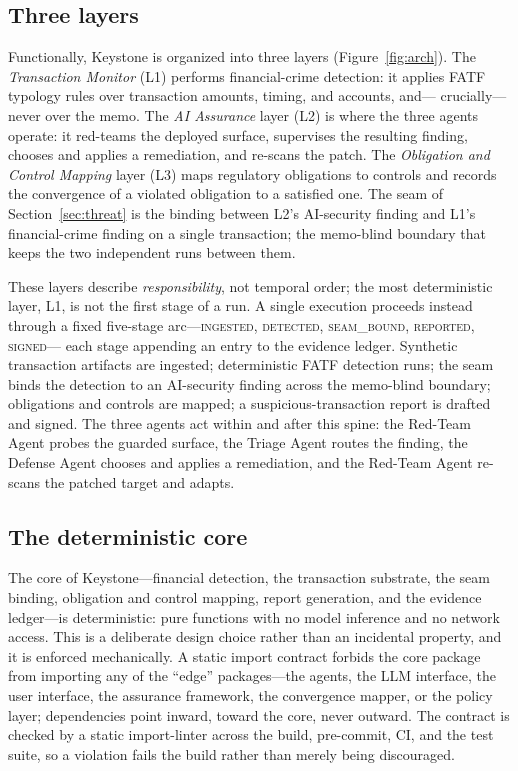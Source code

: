 \documentclass[10pt,twocolumn]{article}
\begin{document}
\subsection{Three layers}

Functionally, Keystone is organized into three layers (Figure~\ref{fig:arch}). The
\emph{Transaction Monitor} (L1) performs financial-crime detection: it applies
FATF typology rules over transaction amounts, timing, and accounts, and---
crucially---never over the memo. The \emph{AI Assurance} layer (L2) is where the
three agents operate: it red-teams the deployed surface, supervises the
resulting finding, chooses and applies a remediation, and re-scans the patch.
The \emph{Obligation and Control Mapping} layer (L3) maps regulatory obligations
to controls and records the convergence of a violated obligation to a satisfied
one. The seam of Section~\ref{sec:threat} is the binding between L2's AI-security finding and
L1's financial-crime finding on a single transaction; the memo-blind boundary
that keeps the two independent runs between them.

These layers describe \emph{responsibility}, not temporal order; the most
deterministic layer, L1, is not the first stage of a run. A single execution
proceeds instead through a fixed five-stage arc---\textsc{ingested},
\textsc{detected}, \textsc{seam\_bound}, \textsc{reported}, \textsc{signed}---
each stage appending an entry to the evidence ledger. Synthetic transaction
artifacts are ingested; deterministic FATF detection runs; the seam binds the
detection to an AI-security finding across the memo-blind boundary; obligations
and controls are mapped; a suspicious-transaction report is drafted and signed.
The three agents act within and after this spine: the Red-Team Agent probes the
guarded surface, the Triage Agent routes the finding, the Defense Agent chooses
and applies a remediation, and the Red-Team Agent re-scans the patched target
and adapts.

\subsection{The deterministic core}

The core of Keystone---financial detection, the transaction substrate, the seam
binding, obligation and control mapping, report generation, and the evidence
ledger---is deterministic: pure functions with no model inference and no network
access. This is a deliberate design choice rather than an incidental property,
and it is enforced mechanically. A static import contract forbids the core
package from importing any of the ``edge'' packages---the agents, the LLM
interface, the user interface, the assurance framework, the convergence mapper,
or the policy layer; dependencies point inward, toward the core, never outward.
The contract is checked by a static import-linter across the build, pre-commit,
CI, and the test suite, so a violation fails the build rather than merely being
discouraged.
\end{document}

